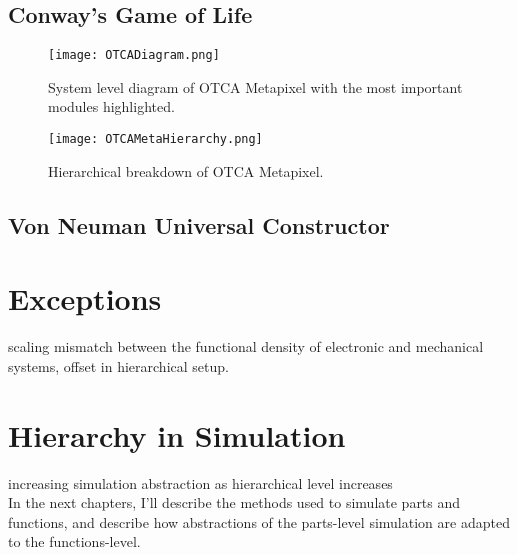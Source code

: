 {\subsection{Conway's Game of Life}

\begin{figure}
  \texttt{[image: OTCADiagram.png]}
  \caption{System level diagram of OTCA Metapixel with the most important modules highlighted.}
  \label{fig:OTCADiagram}
\end{figure}

\begin{sidewaysfigure}
  \texttt{[image: OTCAMetaHierarchy.png]}
  \caption{Hierarchical breakdown of OTCA Metapixel.}
  \label{fig:OTCAMetaHierarchy}
\end{sidewaysfigure}

\subsection{Von Neuman Universal Constructor}

\section{Exceptions}

scaling mismatch between the functional density of electronic and mechanical systems, offset in hierarchical setup.

\section{Hierarchy in Simulation}

increasing simulation abstraction as hierarchical level increases\\

In the next chapters, I'll describe the methods used to simulate parts and functions, and describe how abstractions of the parts-level simulation are adapted to the functions-level.



}
